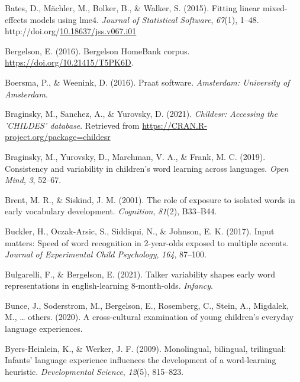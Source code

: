 \documentclass[10pt, letterpaper]{article}
\newenvironment{CSLReferences}%
  {}%
  {\par}
\begin{document}
\hypertarget{refs}{}
\begin{CSLReferences}{1}{0}
\leavevmode\hypertarget{ref-bates2015fitting}{}%
Bates, D., Mächler, M., Bolker, B., \& Walker, S. (2015). Fitting linear
mixed-effects models using {lme4}. \emph{Journal of Statistical
Software}, \emph{67}(1), 1--48.
http://doi.org/\href{https://doi.org/10.18637/jss.v067.i01}{10.18637/jss.v067.i01}

\leavevmode\hypertarget{ref-bergelsoncorpus}{}%
Bergelson, E. (2016). Bergelson HomeBank corpus.
\url{https://doi.org/10.21415/T5PK6D}.

\leavevmode\hypertarget{ref-boersma2016praat}{}%
Boersma, P., \& Weenink, D. (2016). Praat software. \emph{Amsterdam:
University of Amsterdam}.

\leavevmode\hypertarget{ref-braginsky2021childesr}{}%
Braginsky, M., Sanchez, A., \& Yurovsky, D. (2021). \emph{Childesr:
Accessing the 'CHILDES' database}. Retrieved from
\url{https://CRAN.R-project.org/package=childesr}

\leavevmode\hypertarget{ref-braginsky2019consistency}{}%
Braginsky, M., Yurovsky, D., Marchman, V. A., \& Frank, M. C. (2019).
Consistency and variability in children's word learning across
languages. \emph{Open Mind}, \emph{3}, 52--67.

\leavevmode\hypertarget{ref-brent2001role}{}%
Brent, M. R., \& Siskind, J. M. (2001). The role of exposure to isolated
words in early vocabulary development. \emph{Cognition}, \emph{81}(2),
B33--B44.

\leavevmode\hypertarget{ref-buckler2017input}{}%
Buckler, H., Oczak-Arsic, S., Siddiqui, N., \& Johnson, E. K. (2017).
Input matters: Speed of word recognition in 2-year-olds exposed to
multiple accents. \emph{Journal of Experimental Child Psychology},
\emph{164}, 87--100.

\leavevmode\hypertarget{ref-bulgarelli2021talker}{}%
Bulgarelli, F., \& Bergelson, E. (2021). Talker variability shapes early
word representations in english-learning 8-month-olds. \emph{Infancy}.

\leavevmode\hypertarget{ref-bunceURcross}{}%
Bunce, J., Soderstrom, M., Bergelson, E., Rosemberg, C., Stein, A.,
Migdalek, M., \ldots{} others. (2020). A cross-cultural examination of
young children's everyday language experiences.

\leavevmode\hypertarget{ref-byers2009monolingual}{}%
Byers-Heinlein, K., \& Werker, J. F. (2009). Monolingual, bilingual,
trilingual: Infants' language experience influences the development of a
word-learning heuristic. \emph{Developmental Science}, \emph{12}(5),
815--823.


\end{CSLReferences}
\end{document}
